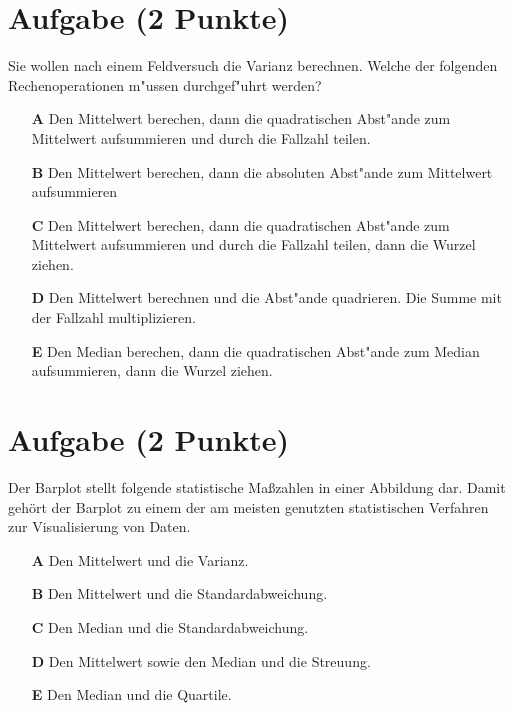 \documentclass[a4paper, 9pt]{scrartcl}\usepackage[]{graphicx}\usepackage[]{xcolor}
\begin{document}
\section{Aufgabe \hfill (2 Punkte)}



Sie wollen nach einem Feldversuch die Varianz berechnen. Welche der folgenden Rechenoperationen m{"u}ssen durchgef{"u}hrt werden?



\begin{enumerate}
\item [\textbf{A} \msquare] Den Mittelwert berechen, dann die quadratischen Abst{"a}nde zum Mittelwert aufsummieren und durch die Fallzahl teilen.
\item [\textbf{B} \msquare] Den Mittelwert berechen, dann die absoluten Abst{"a}nde zum Mittelwert aufsummieren
\item [\textbf{C} \msquare] Den Mittelwert berechen, dann die quadratischen Abst{"a}nde zum Mittelwert aufsummieren und durch die Fallzahl teilen, dann die Wurzel ziehen.
\item [\textbf{D} \msquare] Den Mittelwert berechnen und die Abst{"a}nde quadrieren. Die Summe mit der Fallzahl multiplizieren.
\item [\textbf{E} \msquare] Den Median berechen, dann die quadratischen Abst{"a}nde zum Median aufsummieren, dann die Wurzel ziehen.
\end{enumerate}

\section{Aufgabe \hfill (2 Punkte)}



Der Barplot stellt folgende statistische Ma{\ss}zahlen in einer
Abbildung dar. Damit geh{\"o}rt der Barplot zu einem der am meisten
genutzten statistischen Verfahren zur Visualisierung von Daten. 



\begin{enumerate}
\item [\textbf{A} \msquare] Den Mittelwert und die Varianz.
\item [\textbf{B} \msquare] Den Mittelwert und die Standardabweichung.
\item [\textbf{C} \msquare] Den Median und die Standardabweichung.
\item [\textbf{D} \msquare] Den Mittelwert sowie den Median und die Streuung.
\item [\textbf{E} \msquare] Den Median und die Quartile.
\end{enumerate} 
\end{document}
